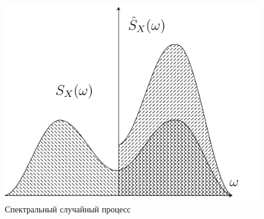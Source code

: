 \documentclass[russian, 12pt, fleqn,x11names]{article}
\begin{document}
\begin{figure}[h!]
\includegraphics[scale = 0.3]{a.png}
\caption{Спектральный случайный процесс}
\end{figure}
\\\iffalse
\end{document}
